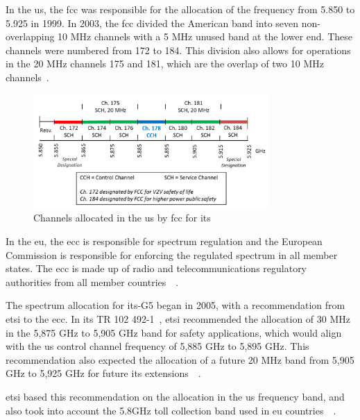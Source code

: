 In the \gls{us}, the \gls{fcc} was responsible for the allocation of the frequency from 5.850 to 5.925 in 1999. In 2003, the \gls{fcc} divided the American band into seven non-overlapping 10 MHz channels with a 5 MHz unused band at the lower end. These channels were numbered from 172 to 184. This division also allows for operations in the 20 MHz channels 175 and 181, which are the overlap of two 10 MHz channels~\cite{harri_multi-channel_2015}.

\begin{figure}[htbp]
    \centering
    \includegraphics[width=0.8\textwidth]{Chapters/Figures/VANETs/WAVE_channels.png}
   	\caption{Channels allocated in the \gls{us} by \gls{fcc} for \gls{its}~\cite{harri_multi-channel_2015}}
   	\label{fig:WAVE_channels}
\end{figure}

In the \gls{eu}, the \gls{ecc} is responsible for spectrum regulation and the European Commission is responsible for enforcing the regulated spectrum in all member states. The \gls{ecc} is made up of radio and telecommunications regulatory authorities from all member countries~\cite{harri_multi-channel_2015}~\cite{asselin-miller_study_2016}.

The spectrum allocation for \gls{its}-G5 began in 2005, with a recommendation from \gls{etsi} to the \gls{ecc}. In its TR 102 492-1~\cite{etsi_electromagnetic_2005}, \gls{etsi} recommended the allocation of 30 MHz in the 5,875 GHz to 5,905 GHz band for safety applications, which would align with the \gls{us} control channel frequency of 5,885 GHz to 5,895 GHz. This recommendation also expected the allocation of a future 20 MHz band from 5,905 GHz to 5,925 GHz for future \gls{its} extensions~\cite{harri_multi-channel_2015}~\cite{asselin-miller_study_2016}.

\gls{etsi} based this recommendation on the allocation in the \gls{us} frequency band, and also took into account the 5.8GHz toll collection band used in \gls{eu} countries~\cite{harri_multi-channel_2015}~\cite{asselin-miller_study_2016}.

